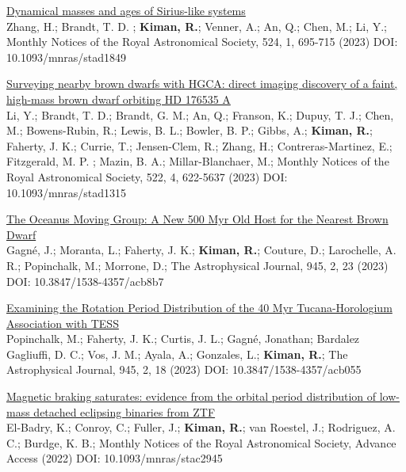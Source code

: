 \documentclass[10pt]{cv}
\begin{document}
\begin{llist}
\begin{etaremune}

 \item \href{https://ui.adsabs.harvard.edu/abs/2023MNRAS.524..695Z/abstract}{Dynamical masses and ages of Sirius-like systems} \\ Zhang, H.; Brandt, T. D. ; \textbf{Kiman, R.}; Venner, A.; An, Q.; Chen, M.; Li, Y.; Monthly Notices of the Royal Astronomical Society, 524, 1, 695-715 (2023) DOI: 10.1093/mnras/stad1849

 \item \href{https://ui.adsabs.harvard.edu/abs/2023MNRAS.522.5622L/abstract}{Surveying nearby brown dwarfs with HGCA: direct imaging discovery of a faint, high-mass brown dwarf orbiting HD 176535 A} \\ Li, Y.; Brandt, T. D.; Brandt, G. M.; An, Q.; Franson, K.; Dupuy, T. J.; Chen, M.; Bowens-Rubin, R.; Lewis, B. L.; Bowler, B. P.; Gibbs, A.; \textbf{Kiman, R.}; Faherty, J. K.; Currie, T.; Jensen-Clem, R.; Zhang, H.; Contreras-Martinez, E.; Fitzgerald, M. P. ; Mazin, B. A.; Millar-Blanchaer, M.; Monthly Notices of the Royal Astronomical Society, 522, 4, 622-5637 (2023) DOI: 10.1093/mnras/stad1315

 \item \href{https://ui.adsabs.harvard.edu/abs/2023ApJ...945..119G/abstract}{The Oceanus Moving Group: A New 500 Myr Old Host for the Nearest Brown Dwarf} \\ Gagn\'e, J.; Moranta, L.; Faherty, J. K.; \textbf{Kiman, R.}; Couture, D.; Larochelle, A. R.; Popinchalk, M.; Morrone, D.; The Astrophysical Journal, 945, 2, 23 (2023) DOI: 10.3847/1538-4357/acb8b7

  \item \href{https://ui.adsabs.harvard.edu/abs/2023ApJ...945..114P/abstract}{Examining the Rotation Period Distribution of the 40 Myr Tucana-Horologium Association with TESS} \\ Popinchalk, M.; Faherty, J. K.; Curtis, J. L.; Gagn\'e, Jonathan; Bardalez Gagliuffi, D. C.; Vos, J. M.; Ayala, A.; Gonzales, L.; \textbf{Kiman, R.}; The Astrophysical Journal, 945, 2, 18 (2023) DOI: 10.3847/1538-4357/acb055

  \item \href{https://ui.adsabs.harvard.edu/abs/2022MNRAS.tmp.2758E/abstract}{Magnetic braking saturates: evidence from the orbital period distribution of low-mass detached eclipsing binaries from ZTF}\\ El-Badry, K.; Conroy, C.; Fuller, J.; \textbf{Kiman, R.}; van Roestel, J.; Rodriguez, A. C.; Burdge, K. B.; Monthly Notices of the Royal Astronomical Society, Advance Access (2022) DOI: 10.1093/mnras/stac2945
  

\end{etaremune}
\end{llist}
\end{document}
